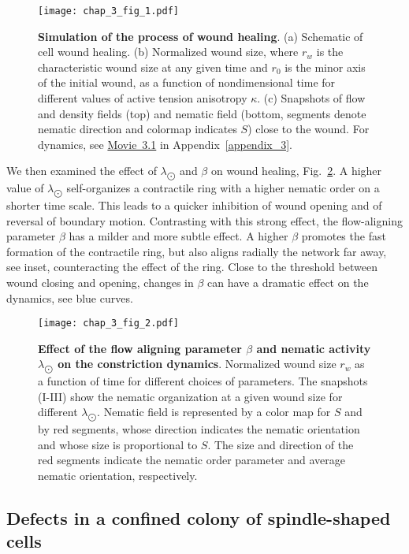 \begin{figure}[H]
	\centering
	\texttt{[image: chap\_3\_fig\_1.pdf]}
	\caption{\label{sec_1_chap_3_fig_1} \textbf{Simulation of the process of wound healing}. (a) Schematic of cell wound healing. (b) Normalized wound size, where $r_w$ is the characteristic wound size at any given time and $r_0$ is the minor axis of the initial wound, as a function of nondimensional time for different values of active tension anisotropy $\kappa$. (c) Snapshots of flow and density fields (top) and nematic field (bottom, segments denote nematic direction and colormap indicates $S$) close to the wound. For dynamics, see \href{https://github.com/waleedmirzaPhD/movies_thesis.git}{Movie~3.1} in Appendix~\ref{appendix_3}.	}
	
\end{figure}
We then examined the effect of $\lambda_{\bigodot}$ and $\beta$ on wound healing,  Fig.~\ref{sec_1_chap_3_fig_2}. A higher value of $\lambda_{\bigodot}$ self-organizes a contractile ring with a higher nematic order on a shorter time scale. This leads to a quicker inhibition of  wound opening and of  reversal of  boundary motion. Contrasting with this strong effect, the flow-aligning parameter $\beta$ has a milder and more subtle effect. A higher $\beta$ promotes the fast formation of the contractile ring, but also aligns radially the network far away, see inset, counteracting the effect of the ring. Close to the threshold between wound closing and opening, changes in $\beta$ can have a dramatic effect on the dynamics, see blue curves.

\begin{figure}[H]
	\centering
	\texttt{[image: chap\_3\_fig\_2.pdf]}
		\caption{\label{sec_1_chap_3_fig_2}  \textbf{Effect of the flow aligning parameter $\beta$ and nematic activity $\lambda_{\bigodot}$ on the constriction dynamics}. Normalized wound size  $r_w$ as a function of time for different choices of parameters. The snapshots (I-III) show the nematic organization at a given wound size for different $\lambda_{\bigodot}$. Nematic field is represented by a color map for $S$ and by red segments, whose direction indicates the nematic orientation and whose size is proportional to $S$. The size and direction of the red segments indicate the nematic order parameter and average nematic orientation, respectively. }
\end{figure}


\subsection{Defects in a confined colony of spindle-shaped cells}

